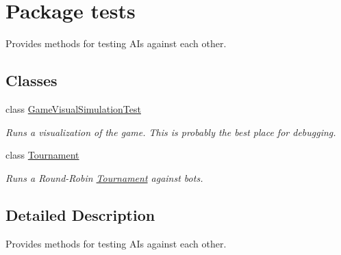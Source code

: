\hypertarget{namespacetests}{
\section{Package tests}
\label{namespacetests}
}


Provides methods for testing AIs against each other.  


\subsection*{Classes}
\begin{DoxyCompactItemize}
\item 
class \hyperlink{classtests_1_1_game_visual_simulation_test}{GameVisualSimulationTest}
\begin{DoxyCompactList}\small\item\em Runs a visualization of the game. This is probably the best place for debugging. \end{DoxyCompactList}\item 
class \hyperlink{classtests_1_1_tournament}{Tournament}
\begin{DoxyCompactList}\small\item\em Runs a Round-\/Robin \hyperlink{classtests_1_1_tournament}{Tournament} against bots. \end{DoxyCompactList}\end{DoxyCompactItemize}


\subsection{Detailed Description}
Provides methods for testing AIs against each other. 
